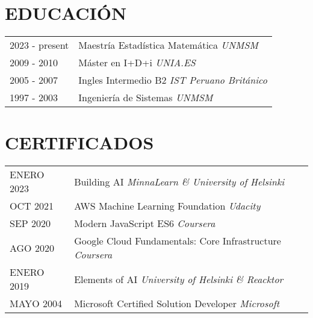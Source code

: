\documentclass[a4paper,12pt]{article}
\begin{document}
\section{EDUCACIÓN}
\begin{tabularx}{\linewidth}{@{}l X@{}}	
2023 - present & Maestría Estadística Matemática \hfill \textsl{UNMSM} \\

2009 - 2010 & Máster en I+D+i \hfill \textsl{UNIA.ES} \\ 

2005 - 2007 & Ingles Intermedio B2 \hfill \textsl{IST Peruano Británico} \\

1997 - 2003 & Ingeniería de Sistemas \hfill \textsl{UNMSM} \\


\end{tabularx}


\section{CERTIFICADOS}

\begin{tabularx}{\linewidth}{@{}l X@{}}	
ENERO 2023 & Building AI \hfill \textsl{MinnaLearn \& University of Helsinki} \\

OCT 2021 & AWS Machine Learning Foundation \hfill \textsl{Udacity} \\ 

SEP 2020 & Modern JavaScript ES6  \hfill \textsl{Coursera} \\

AGO 2020 & Google Cloud Fundamentals: Core Infrastructure  \hfill \textsl{Coursera} \\

ENERO 2019 & Elements of AI  \hfill \textsl{University of Helsinki \& Reacktor} \\

MAYO 2004 & Microsoft Certified Solution Developer  \hfill \textsl{Microsoft} \\

\end{tabularx}

\end{document}
